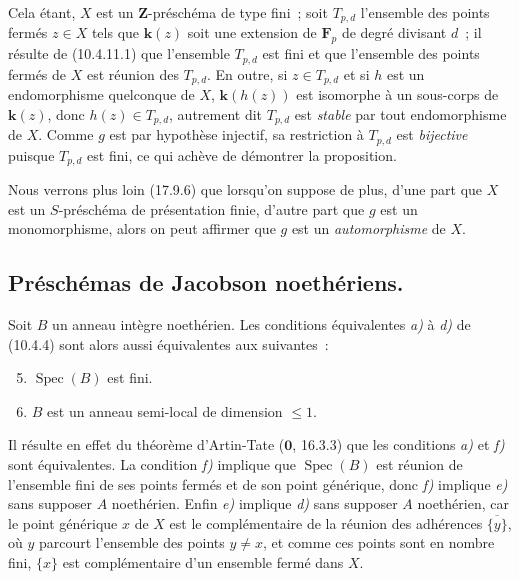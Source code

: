 Cela étant, $X$ est un $\mathbf Z$-préschéma de type fini~; soit $T_{p,d}$
l'ensemble des points fermés $z\in X$ tels que $\boldsymbol{k}(z)$ soit une extension de
$\mathbf F_p$ de degré divisant $d$~; il résulte de (10.4.11.1) que l'ensemble
$T_{p,d}$ est fini et que l'ensemble des points fermés de $X$ est réunion des
$T_{p,d}$. En outre, si $z\in T_{p,d}$ et si $h$ est un endomorphisme
quelconque de $X$, $\boldsymbol{k}(h(z))$ est isomorphe à un sous-corps de $\boldsymbol{k}(z)$, donc
$h(z)\in T_{p,d}$, autrement dit $T_{p,d}$ est \emph{stable} par tout
endomorphisme de $X$. Comme $g$ est par hypothèse injectif, sa restriction à
$T_{p,d}$ est \emph{bijective} puisque $T_{p,d}$ est fini, ce qui achève de
démontrer la proposition.

Nous verrons plus loin (17.9.6) que lorsqu'on suppose de plus, d'une part que
$X$ est un $S$-préschéma de présentation finie, d'autre part que $g$ est un
monomorphisme, alors on peut affirmer que $g$ est un \emph{automorphisme} de
$X$.

\subsection{Préschémas de Jacobson noethériens.}
\label{subsection:IV.10.5-fr}

\begin{proposition}[10.5.1]
\label{IV.10.5.1-fr}
Soit $B$ un anneau intègre noethérien. Les conditions équivalentes \emph{a)} à
\emph{d)} de \textup{(10.4.4)} sont alors aussi équivalentes aux suivantes~:
\begin{enumerate}[label=\alph*)]
  \setcounter{enumi}{4}
  \item $\operatorname{Spec}(B)$ est fini.
  \item $B$ est un anneau semi-local de dimension $\leq1$.
\end{enumerate}
\end{proposition}

Il résulte en effet du théorème d'Artin-Tate ($\mathbf 0$, 16.3.3) que les
conditions \emph{a)} et \emph{f)} sont équivalentes. La condition \emph{f)}
implique que $\operatorname{Spec}(B)$ est réunion de l'ensemble
fini de ses points fermés et de son point générique, donc \emph{f)} implique
\emph{e)} sans supposer $A$ noethérien. Enfin \emph{e)} implique \emph{d)} sans
supposer $A$ noethérien, car le point générique $x$ de $X$ est le complémentaire
de la réunion des adhérences $\overline{\{y\}}$, où $y$ parcourt l'ensemble des
points $y\neq x$, et comme ces points sont en nombre fini, $\{x\}$ est
complémentaire d'un ensemble fermé dans $X$.

